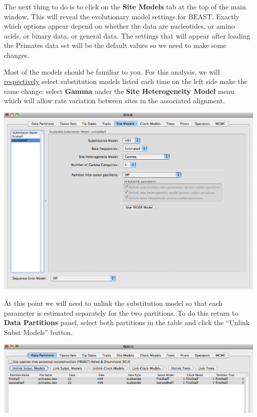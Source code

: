 \documentclass[12pt]{article}
\begin{document}
The next thing to do is to click on the {\bf Site Models} tab at the top of the
main window. This will reveal the evolutionary model settings for
BEAST. Exactly which options appear depend on whether the data are
nucleotides, or amino acids, or binary data, or general data.
The settings that will appear after loading the Primates data set will
be the default values so we need to make some changes. 

Most of the models should be familiar to you. For this analysis, we
will \underline{respectively} select substitution models listed each time on the 
left side make the same change: select \textbf{Gamma} under the 
\textbf{Site Heterogeneity Model} menu which will allow rate variation 
between sites in the associated alignment. 

\medskip{}

\includegraphics[scale=0.4]{figures/BEAUti_Model}

\medskip{}

At this point we will need to unlink the substitution model so that each parameter is estimated separately for the two partitions. To do this return to {\bf Data Partitions} panel, select both partitions in the table and click the ``Unlink Subst Models'' button. 

\medskip{}

\includegraphics[scale=0.4]{figures/BEAUti_Unlink}
\end{document}
